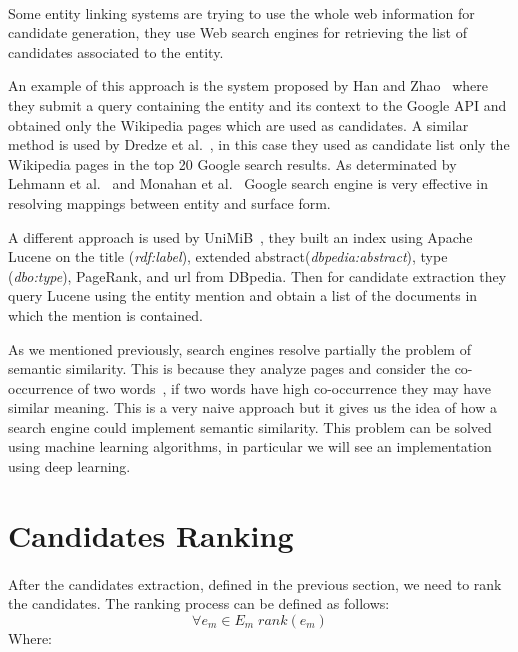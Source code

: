 \paragraph{}
Some entity linking systems are trying to use the whole web information for candidate generation, they use Web search engines for retrieving the list of candidates associated to the entity.


An example of this approach is the system proposed by Han and Zhao~\cite{han2009nlpr_kbp} where they submit a query containing the entity and its context to the Google API and obtained only the Wikipedia pages which are used as candidates. A similar method is used by Dredze et al.~\cite{dredze2010entity}, in this case they used as candidate list only the Wikipedia pages in the top 20 Google search results. As determinated by Lehmann et al.~\cite{lehmann2010lcc} and Monahan et al.~\cite{monahan2011cross} Google search engine is very effective in resolving mappings between entity and surface form.


A different approach is used by UniMiB~\cite{caliano2016unimib}, they built an index using Apache Lucene on the title (\textit{rdf:label}), extended abstract(\textit{dbpedia:abstract}), type (\textit{dbo:type}), PageRank, and url from DBpedia. Then for candidate extraction they query Lucene using the entity mention and obtain a list of the documents in which the mention is contained.


As we mentioned previously, search engines resolve partially the problem of semantic similarity. This is because they analyze pages and consider the co-occurrence of two words~\cite{bollegala2007measuring}, if two words have high co-occurrence they may have similar meaning. This is a very naive approach but it gives us the idea of how a search engine could implement semantic similarity. This problem can be solved using machine learning algorithms, in particular we will see an implementation using deep learning.

\section{Candidates Ranking}
\paragraph{}
After the candidates extraction, defined in the previous section, we need to rank the candidates. The ranking process can be defined as follows:
\begin{equation}
\forall e_m \in E_m \; rank(e_m)
\end{equation}
Where:

